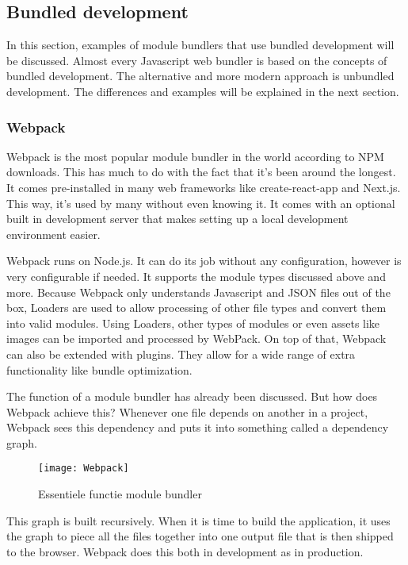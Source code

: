 \subsection{Bundled development}

In this section, examples of module bundlers that use bundled development will be discussed. Almost every Javascript web bundler is based on the concepts of bundled development. The alternative and more modern approach is unbundled development. The differences and examples will be explained in the next section. 

\subsubsection{Webpack}

Webpack is the most popular module bundler in the world according to NPM downloads. This has much to do with the fact that it's been around the longest. It comes pre-installed in many web frameworks like create-react-app and Next.js. This way, it’s used by many without even knowing it. It comes with an optional built in development server that makes setting up a local development environment easier.

Webpack runs on Node.js. It can do its job without any configuration, however is very configurable if needed. It supports the module types discussed above and more. 
Because Webpack only understands Javascript and JSON files out of the box, Loaders are used to allow processing of other file types and convert them into valid modules.
Using Loaders, other types of modules or even assets like images can be imported and processed by WebPack. On top of that, Webpack can also be extended with plugins. They allow for a wide range of extra functionality like bundle optimization. 

The function of a module bundler has already been discussed. But how does Webpack achieve this? Whenever one file depends on another in a project, Webpack sees this dependency and puts it into something called a dependency graph. 

\begin{figure}[h]
\texttt{[image: Webpack]}
    \caption{Essentiele functie module bundler \autocite{webapck-no-date}}
\end{figure}

This graph is built recursively. When it is time to build the application, it uses the graph to piece all the files together into one output file that is then shipped to the browser. Webpack does this both in development as in production. 

